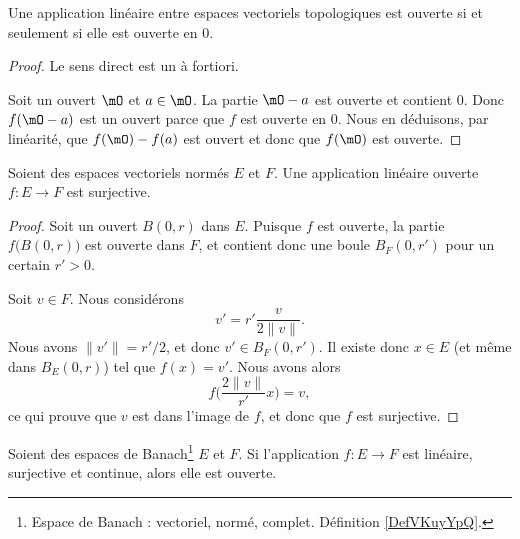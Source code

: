 \begin{lemma}
	Une application linéaire entre espaces vectoriels topologiques est ouverte si et seulement si elle est ouverte en \( 0\).
\end{lemma}

\begin{proof}
	Le sens direct est un à fortiori.

	Soit un ouvert \( \mO\) et \( a\in \mO\). La partie \( \mO-a\) est ouverte et contient \( 0\). Donc \( f(\mO-a)\) est un ouvert parce que \( f\) est ouverte en \( 0\). Nous en déduisons, par linéarité, que \( f(\mO)-f(a)\) est ouvert et donc que \( f(\mO)\) est ouverte.
\end{proof}

\begin{lemma}
	Soient des espaces vectoriels normés \( E\) et \( F\). Une application linéaire ouverte \( f\colon E\to F\) est surjective.
\end{lemma}

\begin{proof}
	Soit un ouvert \( B(0,r)\) dans \( E\). Puisque \( f\) est ouverte, la partie \( f\big( B(0,r) \big)\) est ouverte dans \( F\), et contient donc une boule \( B_F(0,r')\) pour un certain \( r'>0\).

	Soit \( v\in F\). Nous considérons
	\begin{equation}
		v'=r'\frac{ v }{ 2\| v \| }.
	\end{equation}
	Nous avons \( \| v' \|=r'/2\), et donc \( v'\in B_F(0,r')\). Il existe donc \( x\in E\) (et même dans \( B_E(0,r)\)) tel que \( f(x)=v'\). Nous avons alors
	\begin{equation}
		f\big( \frac{ 2\| v \| }{ r' }x \big)=v,
	\end{equation}
	ce qui prouve que \( v\) est dans l'image de \( f\), et donc que \( f\) est surjective.
\end{proof}

\begin{theorem}     \label{THOooATZKooXHWCRD}
	Soient des espaces de Banach\footnote{Espace de Banach : vectoriel, normé, complet. Définition \ref{DefVKuyYpQ}.} \( E\) et \( F\). Si l'application \( f\colon E\to F\) est linéaire, surjective et continue, alors elle est ouverte.
\end{theorem}

